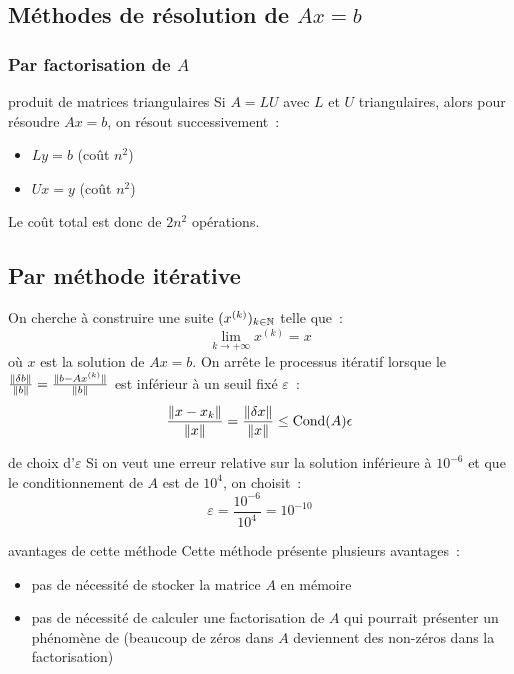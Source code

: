 \subsection{Méthodes de résolution de $Ax = b$}

\subsubsection{Par factorisation de $A$}

\begin{exemple}{}{produit de matrices triangulaires}
    Si $A = LU$  avec $L$ et $U$ triangulaires, alors pour résoudre $Ax = b$, on résout successivement~:
    \begin{itemize}
        \item $Ly = b$ (coût $n^2$)
        \item $Ux = y$ (coût $n^2$)
    \end{itemize}
    Le coût total est donc de $2n^2$ opérations.
\end{exemple}

\subsection{Par méthode itérative}
On cherche à construire une suite $(x^{(k)})_{k\in\mathbb{N}}$ telle que~:
$$\lim_{k \to +\infty} x^{(k)} = x$$
où $x$ est la solution de $Ax = b$. On arrête le processus itératif lorsque le  $\frac{\lVert\delta b \rVert}{\lVert b\rVert}= \frac{\lVert b - A x^{(k)}\rVert}{\lVert b\rVert}$ est inférieur à un seuil fixé $\varepsilon$~:
$$\frac{\lVert x-x_k\rVert}{\lVert x\rVert} = \frac{\lVert\delta x\rVert}{\lVert x\rVert} \leq \mathrm{Cond}(A)\epsilon$$

\begin{exemple}{}{de choix d'$\varepsilon$}
    Si on veut une erreur relative sur la solution inférieure à $10^{-6}$ et que le conditionnement de $A$ est de $10^4$, on choisit~:
    $$\varepsilon = \frac{10^{-6}}{10^4} = 10^{-10}$$
\end{exemple}

\begin{remarque}{}{avantages de cette méthode}
    Cette méthode présente plusieurs avantages~:
    \begin{itemize}
        \item pas de nécessité de stocker la matrice $A$ en mémoire
        \item pas de nécessité de calculer une factorisation de $A$ qui pourrait présenter un phénomène de  (beaucoup de zéros dans $A$ deviennent des non-zéros dans la factorisation)
    \end{itemize}
\end{remarque}

